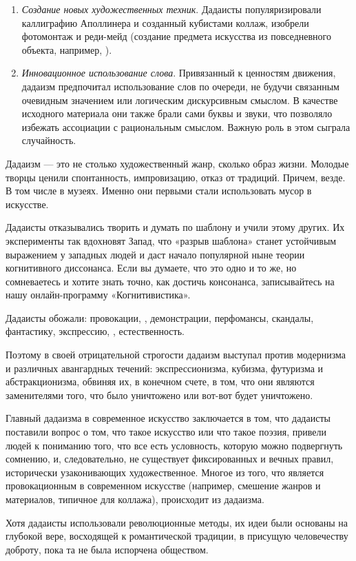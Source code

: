 \begin{enumerate}
    \item \textit{Создание новых художественных техник}. Дадаисты популяризировали каллиграфию Аполлинера и созданный кубистами коллаж, изобрели фотомонтаж и реди-мейд (создание предмета искусства из повседневного объекта, например, ).
    \item \textit{Инновационное использование слова}. Привязанный к ценностям движения, дадаизм предпочитал использование слов по очереди, не будучи связанным очевидным значением или логическим дискурсивным смыслом. В качестве исходного материала они также брали сами буквы и звуки, что позволяло избежать ассоциации с рациональным смыслом. Важную роль в этом сыграла случайность.
\end{enumerate}
Дадаизм --- это не столько художественный жанр, сколько образ жизни. Молодые творцы ценили спонтанность, импровизацию, отказ от традиций. Причем, везде. В том числе в музеях. Именно они первыми стали использовать мусор в искусстве.

Дадаисты отказывались творить и думать по шаблону и учили этому других. Их эксперименты так вдохновят Запад, что «разрыв шаблона» станет устойчивым выражением у западных людей и даст начало популярной ныне теории когнитивного диссонанса. Если вы думаете, что это одно и то же, но сомневаетесь и хотите знать точно, как достичь консонанса, записывайтесь на нашу онлайн-программу «Когнитивистика».

Дадаисты обожали:
провокации,
,
демонстрации,
перфомансы,
скандалы,
фантастику,
экспрессию,
,
естественность.

Поэтому в своей отрицательной строгости дадаизм выступал против модернизма и различных авангардных течений: экспрессионизма, кубизма, футуризма и абстракционизма, обвиняя их, в конечном счете, в том, что они являются заменителями того, что было уничтожено или вот-вот будет уничтожено.

Главный  дадаизма в современное искусство заключается в том, что дадаисты поставили вопрос о том, что такое искусство или что такое поэзия, привели людей к пониманию того, что все есть условность, которую можно подвергнуть сомнению, и, следовательно, не существует фиксированных и вечных правил, исторически узаконивающих художественное. Многое из того, что является провокационным в современном искусстве (например, смешение жанров и материалов, типичное для коллажа), происходит из дадаизма.

Хотя дадаисты использовали революционные методы, их идеи были основаны на глубокой вере, восходящей к романтической традиции, в присущую человечеству доброту, пока та не была испорчена обществом.

